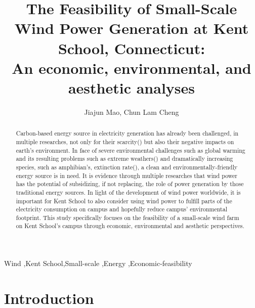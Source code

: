 \documentclass[review]{elsarticle}
\begin{document}
\begin{frontmatter}

\title{The Feasibility of Small-Scale Wind Power Generation at Kent School, Connecticut: \\An economic, environmental, and aesthetic analyses}

\author{Jiajun Mao, Chun Lam Cheng}
\address{1 Macedonia Rd., Kent, CT}

\begin{abstract}
\indent Carbon-based energy source in electricity generation has already been challenged, in multiple researches, not only for their scarcity(\cite{mikael_depletion_of_fossil_fuel}) 
but also their negative impacts on earth’s environment. In face of severe environmental challenges such as global warming and its resulting problems such as extreme 
weathers(\cite{mikael_depletion_of_fossil_fuel}) and dramatically increasing species, such as amphibian's, extinction rate(\cite{alan_amphibian_extinction}), a clean and 
environmentally-friendly energy source is in need. It is evidence through multiple researches that wind power has the potential of subsidizing, if not replacing, the role of 
power generation by those traditional energy sources. In light of the development of wind power worldwide, it is important for Kent School to also consider using wind power to 
fulfill parts of the electricity consumption on campus and hopefully reduce campus’ environmental footprint. This study specifically focuses on the feasibility of a small-scale 
wind farm on Kent School’s campus through economic, environmental and aesthetic perspectives.
\end{abstract}

\begin{keyword}
Wind \sep Kent School\sep Small-scale \sep Energy \sep Economic-feasibility
\end{keyword}

\end{frontmatter}

\linenumbers

\clearpage
\section{Introduction}
\label{sec:Introduction}
\end{document}
